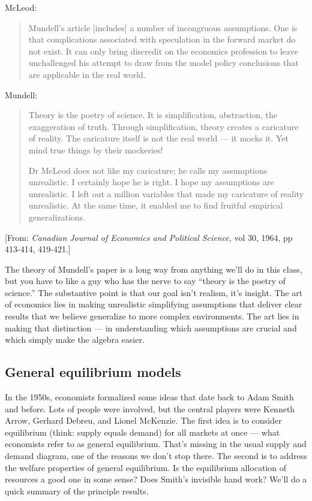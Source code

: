 \documentclass[11pt]{article}
\begin{document}
McLeod:
\begin{quote}
Mundell's article [includes] a number of incongruous assumptions.
One is that complications associated with speculation in the forward market do not exist.
It can only bring discredit on the economics profession to leave unchallenged
his attempt to draw from the model policy conclusions that are applicable in the real world.
\end{quote}
Mundell:
\begin{quote}
Theory is the poetry of science.
It is simplification, abstraction, the exaggeration of truth.
Through simplification, theory creates a caricature of reality.
The caricature itself is not the real world --- it mocks it.
Yet mind true things by their mockeries!

Dr McLeod does not like my caricature; he calls my assumptions unrealistic.
I certainly hope he is right.  I hope my assumptions are unrealistic.
I left out a million variables that made my caricature of reality unrealistic.
At the same time, it enabled me to find fruitful empirical generalizations.
\end{quote}
%
[From:  {\it Canadian Journal of Economics and Political Science\/}, vol 30, 1964, pp 413-414, 419-421.]

The theory of Mundell's paper is a long way from anything
we'll do in this class,
but you have to like a guy who has the nerve to say
``theory is the poetry of science.''
The substantive point is that our goal isn't realism, it's insight.
The art of economics lies in making unrealistic simplifying assumptions that
deliver clear results that we believe generalize to more complex environments.
The art lies in making that distinction ---
in understanding which assumptions are crucial and
which simply make the algebra easier.


\subsection*{General equilibrium models}

In the 1950s, economists formalized some ideas that date back to Adam Smith and before.
Lots of people were involved, but the central players
were Kenneth Arrow, Gerhard Debreu, and Lionel McKenzie.
The first idea is to consider equilibrium (think: supply equals demand)
for all markets at once ---
what economists refer to as general equilibrium.
That's missing in the usual supply and demand diagram,
one of the reasons we don't stop there.
The second is to address the welfare properties of general equilibrium.
Is the equilibrium allocation of resources a good one in some sense?
Does Smith's invisible hand work?
We'll do a quick summary of the principle results.
\end{document}
